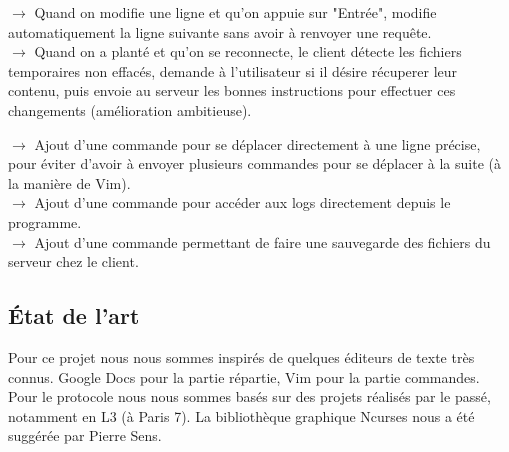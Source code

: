 \documentclass[12pt]{article}
\begin{document}
$\rightarrow$ Quand on modifie une ligne et qu'on appuie sur "Entrée", modifie automatiquement la ligne suivante sans avoir à renvoyer une requête.\\

$\rightarrow$ Quand on a planté et qu'on se reconnecte, le client détecte les fichiers temporaires non effacés, demande à l'utilisateur si il désire récuperer leur contenu, puis envoie au serveur les bonnes instructions pour effectuer ces changements (amélioration ambitieuse).

$\rightarrow$ Ajout d'une commande pour se déplacer directement à une ligne précise, pour éviter d'avoir à envoyer plusieurs commandes pour se déplacer à la suite (à la manière de Vim). \\

$\rightarrow$ Ajout d'une commande pour accéder aux logs directement depuis le programme.\\

$\rightarrow$ Ajout d'une commande permettant de faire une sauvegarde des fichiers du serveur chez le client.\\

\subsection{\'Etat de l'art}
Pour ce projet nous nous sommes inspirés de quelques éditeurs de texte très connus. Google Docs pour la partie répartie, Vim pour la partie commandes. Pour le protocole nous nous sommes basés sur des projets réalisés par le passé, notamment en L3 (à Paris 7). La bibliothèque graphique Ncurses nous a été suggérée par Pierre Sens.
\end{document}
